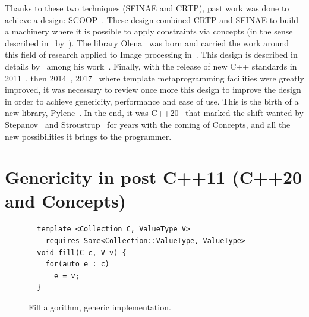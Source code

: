 Thanks to these two techniques (SFINAE and CRTP), past work was done to achieve a design:
SCOOP~\parencite{burrus.2003.mpool,geraud.2006.scoop-pres,geraud.2008.mpool}. These design combined CRTP and SFINAE to
build a machinery where it is possible to apply constraints via concepts (in the sense described
in~ by~\citeauthor{stepanov.2009.elements}). The library
Olena~\parencite{olena.2000.www,geraud.2012.hdr} was born and carried the work around this field of research applied to
Image processing in~\parencite{geraud.2000.icpr,duretlutz.2000.olena,darbon.2002.ismm,darbon.2004.ecoopphd}. This design
is described in details by~\citeauthor{levillain.2011.phd} among his
work~\parencite{levillain.2009.ismm,levillain.2010.icip,levillain.2010.wadgmm,levillain.2011.gretsi,levillain.2011.phd,levillain.2012.wadgmm-lncs,levillain.2014.ciarp}.
Finally, with the release of new C++ standards in 2011~\parencite{iso.2011.cpp}, then 2014~\parencite{iso.2014.cpp},
2017~\parencite{iso.2017.cpp} where template metaprogramming facilities were greatly improved, it was necessary to
review once more this design to improve the design in order to achieve genericity, performance and ease of use. This is
the birth of a new library, Pylene~\parencite{carlinet.2018.pylena}. In the end, it was C++20~\parencite{iso.2011.cpp}
that marked the shift wanted by
Stepanov~\parencite{musser.1988.generic,musser.1994.algorithm,dehnert.1998.fundamentals,stepanov.2009.elements} and
Stroustrup~\parencite{stroustrup.1995.design,stroustrup.1999.hot,stroustrup.2003.concepts,stroustrup.2007.hopl} for
years with the coming of Concepts, and all the new possibilities it brings to the programmer.


\section{Genericity in post C++11 (C++20 and Concepts)}
\label{genericity.sec.language.postcpp11}

\begin{figure}[tbh]
  \centering
  \begin{verbatim}
  template <Collection C, ValueType V>
    requires Same<Collection::ValueType, ValueType>
  void fill(C c, V v) {
    for(auto e : c)
      e = v;
  }
  \end{verbatim}

  \caption{Fill algorithm, generic implementation.}
  \label{fig.gen.fill}
\end{figure}

